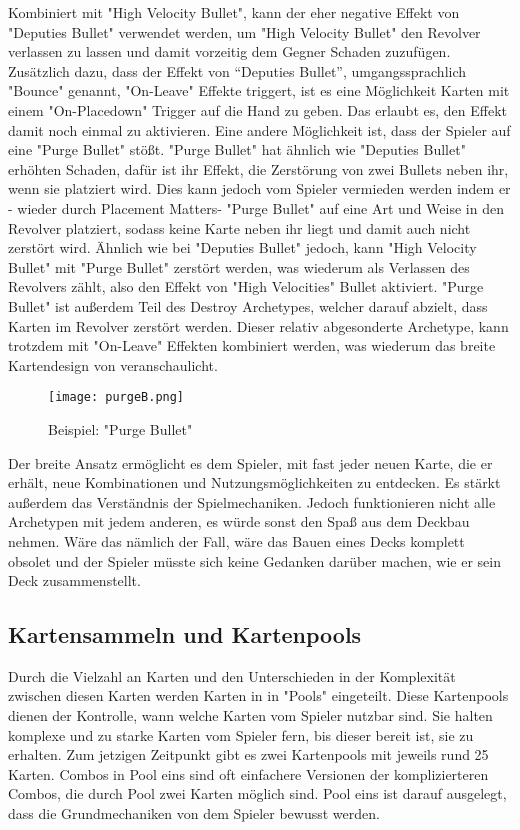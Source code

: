 Kombiniert mit "High Velocity Bullet", kann der eher negative Effekt von "Deputies Bullet" verwendet werden, um
"High Velocity Bullet" den Revolver verlassen zu lassen und damit vorzeitig dem Gegner Schaden zuzufügen.
Zusätzlich dazu, dass der Effekt von “Deputies Bullet”, umgangssprachlich "Bounce" genannt, "On-Leave" Effekte triggert,
ist es eine Möglichkeit Karten mit einem "On-Placedown" Trigger auf die Hand zu geben. Das erlaubt es, den Effekt damit noch einmal zu aktivieren.
Eine andere Möglichkeit ist, dass der Spieler auf eine "Purge Bullet" stößt. "Purge Bullet" hat ähnlich wie "Deputies Bullet"
erhöhten Schaden, dafür ist ihr Effekt, die Zerstörung von zwei Bullets neben ihr, wenn sie platziert wird.
Dies kann jedoch vom Spieler vermieden werden indem er - wieder durch Placement Matters- "Purge Bullet" auf eine Art und
Weise in den Revolver platziert, sodass keine Karte neben ihr liegt und damit auch nicht zerstört wird.
Ähnlich wie bei "Deputies Bullet" jedoch, kann "High Velocity Bullet" mit "Purge Bullet" zerstört werden, was wiederum als
Verlassen des Revolvers zählt, also den Effekt von "High Velocities" Bullet aktiviert. "Purge Bullet" ist außerdem Teil
des Destroy Archetypes, welcher darauf abzielt, dass Karten im Revolver zerstört werden.
Dieser relativ abgesonderte Archetype, kann trotzdem mit "On-Leave" Effekten kombiniert werden, was wiederum das breite
Kartendesign von \FF veranschaulicht.

\begin{figure}[H]
    \texttt{[image: purgeB.png]}
    \caption{Beispiel: "Purge Bullet"}
\end{figure}


Der breite Ansatz ermöglicht es dem Spieler, mit fast jeder neuen Karte, die er erhält, neue Kombinationen und Nutzungsmöglichkeiten zu entdecken.
Es stärkt außerdem das Verständnis der Spielmechaniken.
Jedoch funktionieren nicht alle \FF Archetypen mit jedem anderen, es würde sonst den Spaß aus dem Deckbau nehmen.
Wäre das nämlich der Fall, wäre das Bauen eines Decks komplett obsolet und der Spieler müsste sich keine Gedanken darüber machen, wie er sein Deck zusammenstellt.



\subsection{Kartensammeln und Kartenpools}\label{subsec:placementMatters}

Durch die Vielzahl an Karten und den Unterschieden in der Komplexität zwischen diesen Karten werden Karten in \FF in "Pools" eingeteilt.
Diese Kartenpools dienen der Kontrolle, wann welche Karten vom Spieler nutzbar sind.
Sie halten komplexe und zu starke Karten vom Spieler fern, bis dieser bereit ist, sie zu erhalten.
Zum jetzigen Zeitpunkt gibt es zwei Kartenpools mit jeweils rund 25 Karten. Combos in Pool eins sind oft einfachere
Versionen der komplizierteren Combos, die durch Pool zwei Karten möglich sind.
Pool eins ist darauf ausgelegt, dass die Grundmechaniken von \FF dem Spieler bewusst werden.


